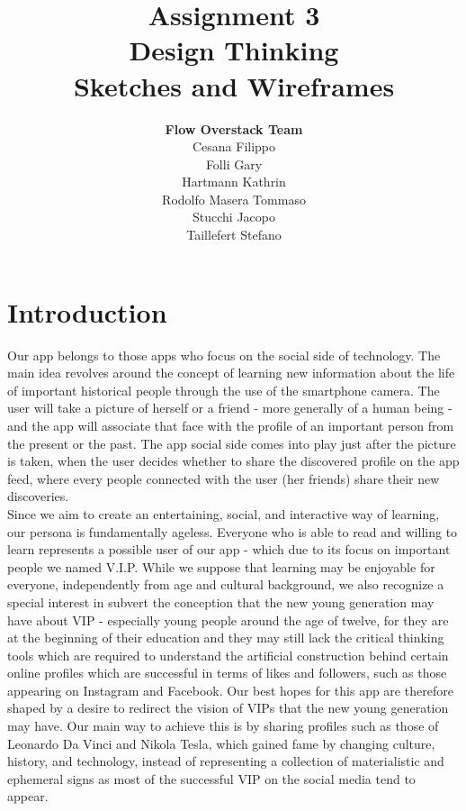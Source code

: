\documentclass[12pt]{scrartcl}
\title{Assignment 3\\ Design Thinking\\ Sketches and Wireframes}
\author{\textbf{Flow Overstack Team}\\ Cesana Filippo\\ Folli Gary\\ Hartmann Kathrin\\ Rodolfo Masera Tommaso\\ Stucchi Jacopo\\ Taillefert Stefano}
\date{}
\begin{document}
\maketitle

\tableofcontents

\newpage


\section{Introduction}

	
	Our app belongs to those apps who focus on the social side of technology.  The main idea revolves around the concept of learning new information about the life of important historical people through the use of the smartphone camera. The user will take a picture of herself or a friend - more generally of a human being - and the app will associate that face with the profile of an important person from the present or the past. The app social side comes into play just after the picture is taken, when the user decides whether to share the discovered profile on the app feed, where every people connected with the user (her friends) share their new discoveries.\\
	
	Since we aim to create an entertaining, social, and interactive way of learning, our persona is fundamentally ageless. Everyone who is able to read and willing to learn represents a possible user of our app - which due to its focus on important people we named V.I.P. While we suppose that learning may be enjoyable for everyone, independently from age and cultural background, we also recognize a special interest in subvert the conception that the new young generation may have about VIP - especially young people around the age of twelve, for they are at the beginning of their education and they may still lack the critical thinking tools which are required to understand the artificial construction behind certain online profiles which are successful in terms of likes and followers, such as those appearing on Instagram and Facebook. Our best hopes for this app are therefore shaped by a desire to redirect the vision of VIPs that the new young generation may have. Our main way to achieve this is by sharing profiles such as those of Leonardo Da Vinci and Nikola Tesla, which gained fame by changing culture, history, and technology, instead of representing a collection of materialistic and ephemeral signs as most of the successful VIP on the social media tend to appear.\\
  
\end{document}
